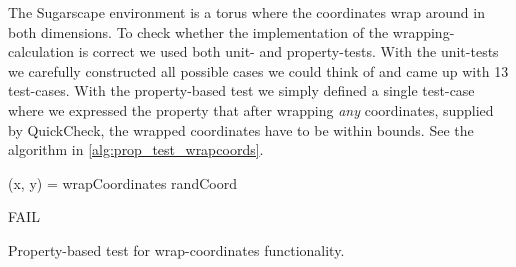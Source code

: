 The Sugarscape environment is a torus where the coordinates wrap around in both dimensions. To check whether the implementation of the wrapping-calculation is correct we used both unit- and property-tests. With the unit-tests we carefully constructed all possible cases we could think of and came up with 13 test-cases. With the property-based test we simply defined a single test-case where we expressed the property that after wrapping \textit{any} coordinates, supplied by QuickCheck, the wrapped coordinates have to be within bounds. See the algorithm in \ref{alg:prop_test_wrapcoords}.

\begin{algorithm}
(x, y) = wrapCoordinates randCoord\;

 {
  FAIL\;
}
\caption{Property-based test for wrap-coordinates functionality.}
\end{algorithm}
\label{alg:prop_test_wrapcoords}